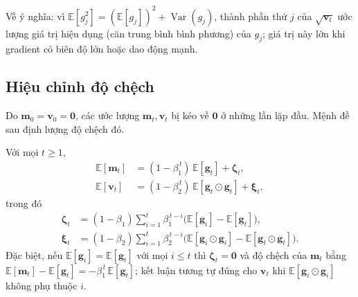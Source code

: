 Về ý nghĩa: vì $\mathbb{E}[g_j^2]=(\mathbb{E}[g_j])^2+\operatorname{Var}(g_j)$, thành phần thứ $j$ của $\sqrt{\mathbf{v}_t}$ ước lượng giá trị hiệu dụng (căn trung bình bình phương) của $g_j$; giá trị này lớn khi gradient có biên độ lớn hoặc dao động mạnh.

\subsection{Hiệu chỉnh độ chệch}

Do $\mathbf{m}_0=\mathbf{v}_0=\mathbf{0}$, các ước lượng $\mathbf{m}_t,\mathbf{v}_t$ bị kéo về $\mathbf{0}$ ở những lần lặp đầu. Mệnh đề sau định lượng độ chệch đó.

\begin{proposition}\label{prop:adam-bias}
Với mọi $t\ge1$,
\begin{align}
  \mathbb{E}[\mathbf{m}_t]&=(1-\beta_1^{\,t})\,\mathbb{E}[\mathbf{g}_t]+\boldsymbol{\zeta}_t, \label{eq:adam-bias-m}\\
  \mathbb{E}[\mathbf{v}_t]&=(1-\beta_2^{\,t})\,\mathbb{E}[\mathbf{g}_t\odot\mathbf{g}_t]+\boldsymbol{\xi}_t, \label{eq:adam-bias-v}
\end{align}
trong đó
\begin{align}
  \boldsymbol{\zeta}_t&=(1-\beta_1)\sum_{i=1}^{t}\beta_1^{\,t-i}\big(\mathbb{E}[\mathbf{g}_i]-\mathbb{E}[\mathbf{g}_t]\big), \label{eq:adam-zeta}\\
  \boldsymbol{\xi}_t&=(1-\beta_2)\sum_{i=1}^{t}\beta_2^{\,t-i}\big(\mathbb{E}[\mathbf{g}_i\odot\mathbf{g}_i]-\mathbb{E}[\mathbf{g}_t\odot\mathbf{g}_t]\big). \label{eq:adam-xi}
\end{align}
Đặc biệt, nếu $\mathbb{E}[\mathbf{g}_i]=\mathbb{E}[\mathbf{g}_t]$ với mọi $i\le t$ thì $\boldsymbol{\zeta}_t=\mathbf{0}$ và độ chệch của $\mathbf{m}_t$ bằng $\mathbb{E}[\mathbf{m}_t]-\mathbb{E}[\mathbf{g}_t]=-\beta_1^{\,t}\,\mathbb{E}[\mathbf{g}_t]$; kết luận tương tự đúng cho $\mathbf{v}_t$ khi $\mathbb{E}[\mathbf{g}_i\odot\mathbf{g}_i]$ không phụ thuộc $i$.
\end{proposition}

